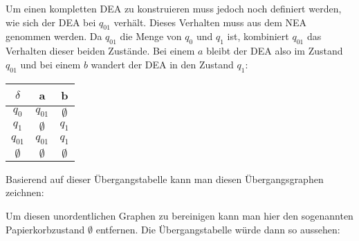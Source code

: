\begin{flushleft}
Um einen kompletten DEA zu konstruieren muss jedoch noch definiert werden,
wie sich der DEA bei $q_{01}$ verhält. Dieses Verhalten muss aus dem NEA
genommen werden. Da $q_{01}$ die Menge von $q_0$ und $q_1$ ist,
kombiniert $q_{01}$ das Verhalten dieser beiden Zustände.
Bei einem $a$ bleibt der DEA also im Zustand $q_{01}$ und bei einem $b$ wandert 
der DEA in den Zustand $q_1$:
\end{flushleft}

\begin{center}
\begin{tabular}{|c|c|c|}
    \hline
    $\delta$ & a & b \\
    \hline
    $q_0$ & $q_{01}$ & $\emptyset$ \\
    \hline
    $q_1$ & $\emptyset$ & $q_1$ \\
    \hline
    $q_{01}$ & $q_{01}$ & $q_1$ \\
    \hline
    $\emptyset$ & $\emptyset$ & $\emptyset$ \\
    \hline
\end{tabular}
\end{center}

\begin{flushleft}
Basierend auf dieser Übergangstabelle kann man diesen Übergangsgraphen zeichnen:
\end{flushleft}

\begin{center}
\end{center}

\begin{flushleft}
Um diesen unordentlichen Graphen zu bereinigen kann man hier
den sogenannten Papierkorbzustand $\emptyset$ entfernen.
Die Übergangstabelle würde dann so aussehen:
\end{flushleft}

